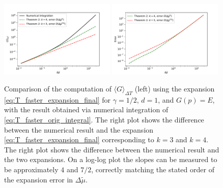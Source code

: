 \documentclass[sn-mathphys,Numbered]{sn-jnl}
\begin{document}

\begin{figure}[t]
\centering
\includegraphics[width=0.49\textwidth]{./plot/FD_avg_expansion_comparison_T_decay_faster.pdf}
\includegraphics[width=0.49\textwidth]{./plot/FD_avg_expansion_error_comparison_T_decay_faster.pdf}
\caption{Comparison of the computation of $\langle G\rangle_{\Delta T}$   (left) using the expansion \eqref{eq:T_faster_expansion_final} for $\gamma=1/2$, $d=1$, and $G(p)=E$, with the result obtained via numerical integration of \eqref{eq:T_faster_orig_integral}. The right plot shows the difference between the numerical result and the expansion \eqref{eq:T_faster_expansion_final} corresponding to $k=3$ and $k=4$.  The right plot shows the difference between the numerical result and the two expansions.  On a log-log plot  the slopes can be measured to be approximately $4$ and $7/2$, correctly matching the stated order of the expansion error in $\Delta\widetilde{\mu}$. }\label{fig:T_faster_expansion_comparison}
\end{figure}
\end{document}
